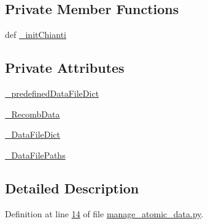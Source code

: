\subsection*{Private Member Functions}
\begin{DoxyCompactItemize}
\item 
def \hyperlink{classpyneb_1_1utils_1_1manage__atomic__data_1_1___manage_atomic_data_a621d38a350975adcf36e10b0706ecd89}{\-\_\-init\-Chianti}
\end{DoxyCompactItemize}
\subsection*{Private Attributes}
\begin{DoxyCompactItemize}
\item 
\hyperlink{classpyneb_1_1utils_1_1manage__atomic__data_1_1___manage_atomic_data_ad9b54bc077170e477f23059e2256b30f}{\-\_\-predefined\-Data\-File\-Dict}
\item 
\hyperlink{classpyneb_1_1utils_1_1manage__atomic__data_1_1___manage_atomic_data_a01eaf095b647e87d3dbf9094104f680c}{\-\_\-\-Recomb\-Data}
\item 
\hyperlink{classpyneb_1_1utils_1_1manage__atomic__data_1_1___manage_atomic_data_a25a8e0770b6d8a375cfc9092d600684d}{\-\_\-\-Data\-File\-Dict}
\item 
\hyperlink{classpyneb_1_1utils_1_1manage__atomic__data_1_1___manage_atomic_data_a92da10ed6b2395c54f88300c05a71ae9}{\-\_\-\-Data\-File\-Paths}
\end{DoxyCompactItemize}


\subsection{Detailed Description}


Definition at line \hyperlink{manage__atomic__data_8py_source_l00014}{14} of file \hyperlink{manage__atomic__data_8py_source}{manage\-\_\-atomic\-\_\-data.\-py}.



